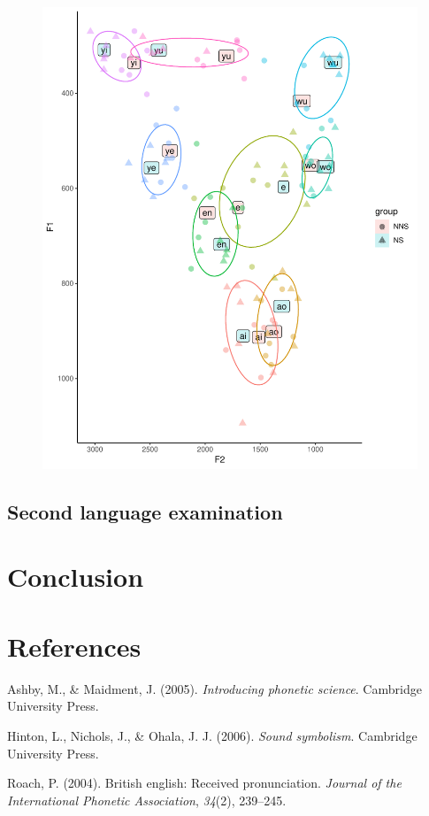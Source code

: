 \documentclass[man, fleqn, noextraspace]{apa6}
\begin{document}
\begin{figure}
\centering
\includegraphics{Vowel_v2_files/figure-latex/figure3-1.pdf}
\caption{}
\end{figure}

\subsection{Second language
examination}\label{second-language-examination}

\section{Conclusion}\label{conclusion}

\newpage

\section{References}\label{references}

\begingroup
\setlength{\parindent}{-0.5in} \setlength{\leftskip}{0.5in}

\hypertarget{refs}{}
\hypertarget{ref-ashby2005}{}
Ashby, M., \& Maidment, J. (2005). \emph{Introducing phonetic science}.
Cambridge University Press.

\hypertarget{ref-hinton2006}{}
Hinton, L., Nichols, J., \& Ohala, J. J. (2006). \emph{Sound symbolism}.
Cambridge University Press.

\hypertarget{ref-roach2004}{}
Roach, P. (2004). British english: Received pronunciation. \emph{Journal
of the International Phonetic Association}, \emph{34}(2), 239--245.

\endgroup
\end{document}
